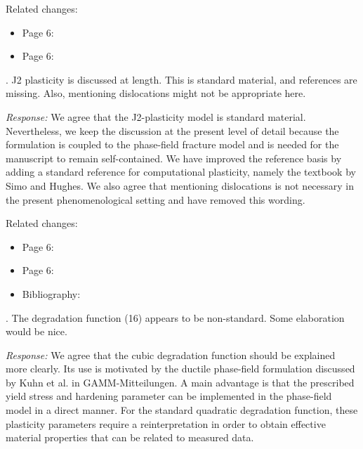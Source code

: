 \documentclass[pdflatex,sn-mathphys-num]{sn-jnl}
\begin{document}
Related changes:
\begin{itemize}
\item Page 6:  
\item Page 6: 
\end{itemize}

\bigskip

. J2 plasticity is discussed at length. This is standard material, and references are missing. Also, mentioning dislocations might not be appropriate here.

\emph{Response:} We agree that the J2-plasticity model is standard material. Nevertheless, we keep the discussion at the present level of detail because the formulation is coupled to the phase-field fracture model and is needed for the manuscript to remain self-contained. We have improved the reference basis by adding a standard reference for computational plasticity, namely the textbook by Simo and Hughes. We also agree that mentioning dislocations is not necessary in the present phenomenological setting and have removed this wording.

Related changes:
\begin{itemize}
\item Page 6: 
\item Page 6:  
\item Bibliography: 
\end{itemize}

\bigskip

. The degradation function (16) appears to be non-standard. Some elaboration would be nice.

\emph{Response:} We agree that the cubic degradation function should be explained more clearly. Its use is motivated by the ductile phase-field formulation discussed by Kuhn et al. in GAMM-Mitteilungen. A main advantage is that the prescribed yield stress and hardening parameter can be implemented in the phase-field model in a direct manner. For the standard quadratic degradation function, these plasticity parameters require a reinterpretation in order to obtain effective material properties that can be related to measured data.
\end{document}

